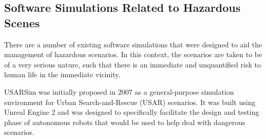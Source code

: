 \subsection{Software Simulations Related to Hazardous Scenes}
There are a number of existing software simulations that were designed to aid the management of hazardous scenarios. In this context, the scenarios are taken to be of a very serious nature, such that there is an immediate and unquantified risk to human life in the immediate vicinity.

USARSim \cite{Carpin2007USARSim:Education} was initially proposed in 2007 as a general-purpose simulation environment for Urban Search-and-Rescue (USAR) scenarios. It was built using Unreal Engine 2 and was designed to specifically facilitate the design and testing phase of autonomous robots that would be used to help deal with dangerous scenarios.










